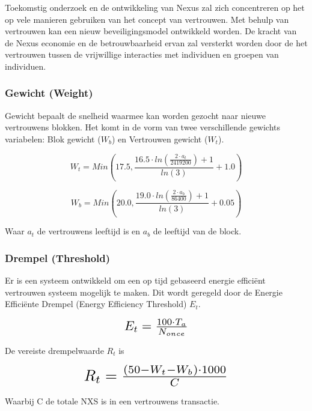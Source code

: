 \documentclass[11pt]{article}
\begin{document}
\noindent Toekomstig onderzoek en de ontwikkeling van Nexus zal zich concentreren op het op vele manieren gebruiken van het concept van vertrouwen. Met behulp van vertrouwen kan een nieuw beveiligingsmodel ontwikkeld worden. De kracht van de Nexus economie en de betrouwbaarheid ervan zal versterkt worden door de het vertrouwen tussen de vrijwillige interacties met individuen en groepen van individuen.

\subsubsection{Gewicht (Weight)}

Gewicht bepaalt de snelheid waarmee kan worden gezocht naar nieuwe vertrouwens blokken. Het komt in de vorm van twee verschillende gewichts variabelen: Blok gewicht ($W_b$) en Vertrouwen gewicht ($W_t$).

\begin{equation}
W_{t} = Min(17.5, \frac{16.5 \cdot ln(\frac{2 \cdot a_t}{2419200}) + 1}{ln(3)} + 1.0)
\end{equation}

\begin{equation}
W_{b} = Min(20.0,\frac{19.0 \cdot ln(\frac{2 \cdot a_b}{86400}) + 1}{ln(3)} + 0.05)
\end{equation}

\noindent Waar $a_t$ de vertrouwens leeftijd is en $a_b$ de leeftijd van de block.

\subsubsection{Drempel (Threshold)}

Er is een systeem ontwikkeld om een op tijd gebaseerd ​​energie effici\"ent vertrouwen systeem mogelijk te maken. Dit wordt geregeld door de Energie Effici\"ente Drempel (Energy Efficiency Threshold) $E_t$.

\begin{equation}
\resizebox{.22\hsize}{!}{$E_{t} = \frac{100 \cdot T_{a}}{N_{once}}$}
\end{equation}

\pagebreak
De vereiste drempelwaarde $R_t$ is

\begin{equation}
\resizebox{.5\hsize}{!}{$R_{t} = \frac{(50 - W_{t} - W_{b}) \cdot 1000}{C}$}
\end{equation}

Waarbij C de totale NXS is in een vertrouwens transactie.
\end{document}
